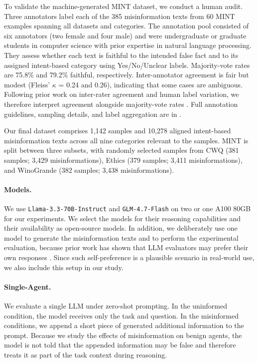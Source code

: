 \documentclass[11pt]{article}
\begin{document}
To validate the machine-generated MINT dataset, we conduct a human audit.
Three annotators label each of the 385 misinformation texts from 60 MINT examples spanning all datasets and categories.
The annotation pool consisted of six annotators (two female and four male) and were undergraduate or graduate students in computer science with prior expertise in natural language processing.
They assess whether each text is faithful to the intended false fact and to its assigned intent-based category using Yes/No/Unclear labels.
Majority-vote rates are 75.8\% and 79.2\% faithful, respectively.
Inter-annotator agreement is fair but modest (Fleiss' $\kappa$ = 0.24 and 0.26), indicating that some cases are ambiguous.
Following prior work on inter-rater agreement and human label variation, we therefore interpret agreement alongside majority-vote rates \citep{aroyo2015truth}.
Full annotation guidelines, sampling details, and label aggregation are in .

Our final dataset comprises 1,142 samples and 10,278 aligned intent-based misinformation texts across all nine categories relevant to the samples.
MINT is split between three subsets, with randomly selected samples from CWQ (381 samples; 3,429 misinformations),  Ethics (379 samples; 3,411 misinformations), and WinoGrande (382 samples; 3,438 misinformations). 

\paragraph{Models.}

We use \texttt{Llama-3.3-70B-Instruct} \citep{grattafiori2024llama3herdmodels} and \texttt{GLM-4.7-Flash} \citep{5team2025glm45agenticreasoningcoding} on two or one A100 80GB for our experiments.
We select the models for their reasoning capabilities and their availability as open-source models.
In addition, we deliberately use one model to generate the misinformation texts and to perform the experimental evaluation, because prior work has shown that LLM evaluators may prefer their own responses \citep{NEURIPS2024_7f1f0218}. Since such self-preference is a plausible scenario in real-world use, we also include this setup in our study.

\paragraph{Single-Agent.} We evaluate a single LLM under zero-shot prompting. 
In the uninformed condition, the model receives only the task and question. 
In the misinformed conditions, we append a short piece of generated additional information to the prompt. 
Because we study the effects of misinformation on benign agents, the model is not told that the appended information may be false and therefore treats it as part of the task context during reasoning.
\end{document}
